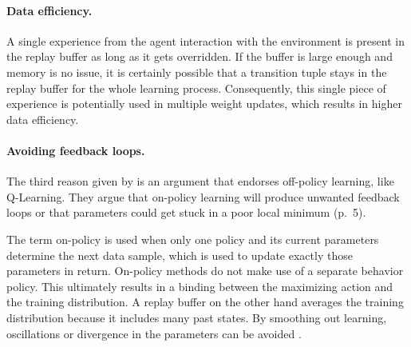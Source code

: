 \paragraph{Data efficiency.} A single experience from the agent interaction with the environment is present in the replay buffer as long as it gets overridden. If the buffer is large enough and memory is no issue, it is certainly possible that a transition tuple stays in the replay buffer for the whole learning process. Consequently, this single piece of experience is potentially used in multiple weight updates, which results in higher data efficiency.

\paragraph{Avoiding feedback loops.} The third reason given by \cite{mnih2013playing} is an argument that endorses off-policy learning, like Q-Learning. They argue that on-policy learning will produce unwanted feedback loops or that parameters could get stuck in a poor local minimum (p.~5). 
\par 
The term on-policy is used when only one policy and its current parameters determine the next data sample, which is used to update exactly those parameters in return. On-policy methods do not make use of a separate behavior policy. This ultimately results in a  binding between the maximizing action and the training distribution. A replay buffer on the other hand averages the training distribution because it includes many past states. By smoothing out learning,
oscillations or divergence in the parameters can be avoided \cite[p.~5]{mnih2013playing}.